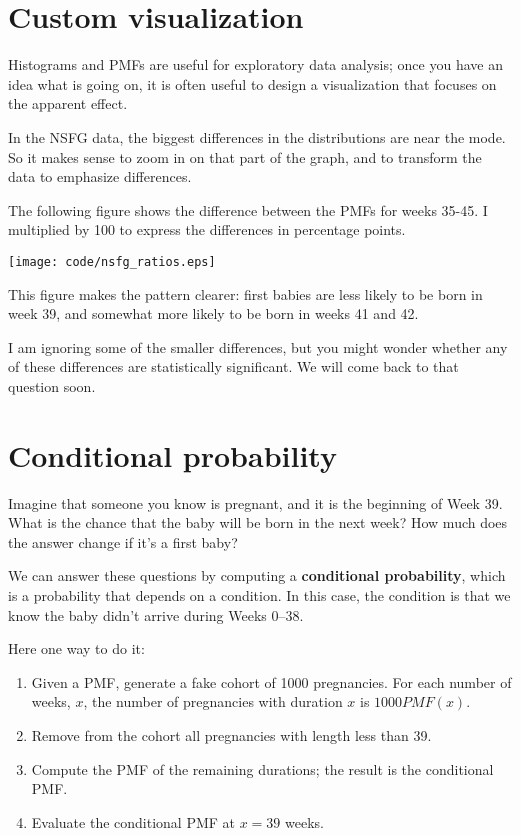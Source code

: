 \documentclass[10pt]{book}
\begin{document}
\section{Custom visualization}

Histograms and PMFs are useful for exploratory data analysis;
once you have an idea what is going on, it is often useful to
design a visualization that focuses on the apparent effect.

In the NSFG data, the biggest differences
in the distributions are near the mode.  So it makes sense to
zoom in on that part of the graph, and to transform the data to
emphasize differences.

The following figure shows the difference between the PMFs for weeks
35-45.  I multiplied by 100 to express the differences in percentage
points.

\beforefig
\centerline{\texttt{[image: code/nsfg\_ratios.eps]}}
\afterfig

This figure makes the pattern clearer: first babies are
less likely to be born in week 39, and somewhat more likely
to be born in weeks 41 and 42.

I am ignoring some of the smaller differences, but you might wonder
whether any of these differences are statistically significant.
We will come back to that question soon.

\section{Conditional probability}

Imagine that someone you know is pregnant, and it is the
beginning of Week 39.  What is the chance that the baby will
be born in the next week?  How much does the answer change if
it's a first baby?

We can answer these questions by computing a {\bf conditional
probability}, which is a probability that depends on a condition.
In this case, the condition is that we know the baby didn't arrive
during Weeks 0--38.

Here one way to do it:

\begin{enumerate}

\item Given a PMF, generate a fake cohort of 1000 pregnancies.
For each number of weeks, $x$, the number of pregnancies with
duration $x$ is $1000 PMF(x)$.

\item Remove from the cohort all pregnancies with length less than 39.

\item Compute the PMF of the remaining durations; the result is the
conditional PMF.

\item Evaluate the conditional PMF at $x = 39$ weeks.

\end{enumerate}
\end{document}
